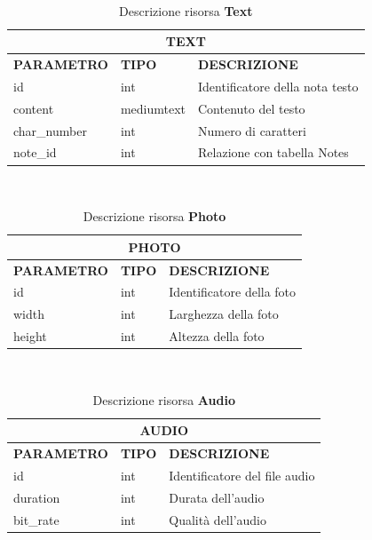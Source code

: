 \ \linebreak
\begin{table}[!h]
\centering
	\begin{tabular}{@{}lll@{}}
		\toprule
		\multicolumn{3}{c}{\textbf{TEXT}}                                    \\ \midrule
		\textbf{PARAMETRO} & \textbf{TIPO} & \textbf{DESCRIZIONE}            \\
		id                 & int           & Identificatore della nota testo \\
		content            & mediumtext    & Contenuto del testo             \\
		char\_number       & int           & Numero di caratteri             \\
		note\_id           & int           & Relazione con tabella Notes      \\ \bottomrule
	\end{tabular}
\caption{Descrizione risorsa \textbf{Text}}\label{tab:textModel}
\end{table}

\ \linebreak
\begin{table}[!h]
\centering
	\begin{tabular}{@{}lll@{}}
		\toprule
		\multicolumn{3}{c}{\textbf{PHOTO}}                             \\ \midrule
		\textbf{PARAMETRO} & \textbf{TIPO} & \textbf{DESCRIZIONE}      \\
		id                 & int           & Identificatore della foto \\
		width              & int           & Larghezza della foto      \\
		height             & int           & Altezza della foto        \\ \bottomrule
	\end{tabular}
\caption{Descrizione risorsa \textbf{Photo}}\label{tab:photoModel}
\end{table}

\ \linebreak
\begin{table}[!h]
\centering
	\begin{tabular}{@{}lll@{}}
		\toprule
		\multicolumn{3}{c}{\textbf{AUDIO}}                                 \\ \midrule
		\textbf{PARAMETRO} & \textbf{TIPO} & \textbf{DESCRIZIONE}          \\
		id                 & int           & Identificatore del file audio \\
		duration           & int           & Durata dell'audio             \\
		bit\_rate          & int           & Qualità dell'audio            \\ \bottomrule
	\end{tabular}
\caption{Descrizione risorsa \textbf{Audio}}\label{tab:audioModel}
\end{table}

